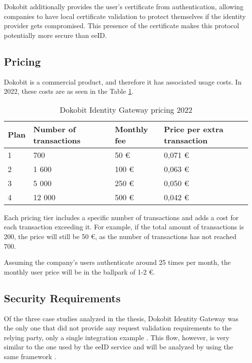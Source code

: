 Dokobit additionally provides the user's certificate from authentication, allowing companies to have local certificate validation to protect themselves if the identity provider gets compromised. This presence of the certificate makes this protocol potentially more secure than eeID.

\subsection{Pricing}

Dokobit is a commercial product, and therefore it has associated usage costs. In 2022, these costs are as seen in the Table \ref{tab:dokobit-pricing}.

\begin{table}[h]
  \centering
  \caption{Dokobit Identity Gateway pricing 2022}
  \begin{tabular}{| l | l | l | l |}
    \hline
    \bf{Plan} & \bf{Number of transactions} & \bf{Monthly fee} & \bf{Price per extra transaction} \\
    \hline
    1         & 700                         & 50 €             & 0,071 €                          \\
    \hline
    2         & 1 600                       & 100 €            & 0,063 €                          \\
    \hline
    3         & 5 000                       & 250 €            & 0,050 €                          \\
    \hline
    4         & 12 000                      & 500 €            & 0,042 €                          \\
    \hline
  \end{tabular}
  \label{tab:dokobit-pricing}
\end{table}

Each pricing tier includes a specific number of transactions and adds a cost for each transaction exceeding it. For example, if the total amount of transactions is 200, the price will still be 50 €, as the number of transactions has not reached 700.

Assuming the company's users authenticate around 25 times per month, the monthly user price will be in the ballpark of 1-2 €.

\subsection{Security Requirements}

Of the three case studies analyzed in the thesis, Dokobit Identity Gateway was the only one that did not provide any request validation requirements to the relying party, only a single integration example \cite{dokobit-idgw-docs}. This flow, however, is very similar to the one used by the eeID service and will be analyzed by using the same framework \cite{ietf-oauth-security-topics-19}.

